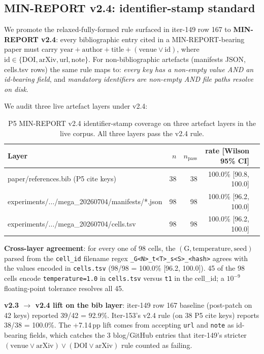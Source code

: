 \subsection{MIN-REPORT v2.4: identifier-stamp standard}
\label{sec:p5-iter153-v24}

We promote the relaxed-fully-formed rule surfaced in iter-149 row 167 to
\textbf{MIN-REPORT v2.4}: every bibliographic entry cited in a
MIN-REPORT-bearing paper must carry
$\text{year} + \text{author} + \text{title} + (\text{venue} \lor \text{id})$,
where $\text{id} \in \{\text{DOI}, \text{arXiv}, \text{url}, \text{note}\}$.
For non-bibliographic artefacts (manifests JSON, cells.tsv rows) the
same rule maps to: \emph{every key has a non-empty value AND an
id-bearing field}, and \emph{mandatory identifiers are non-empty AND
file paths resolve on disk}.

We audit three live artefact layers under v2.4:

\begin{table}[htbp]
\centering
\small
\begin{tabular}{lrrrl}
\hline
\textbf{Layer} & \textbf{$n$} & \textbf{$n_{\text{pass}}$} & \textbf{rate [Wilson 95\% CI]} \\
\hline
paper/references.bib (P5 cite keys)            & 38 & 38 & 100.0\% [90.8, 100.0] \\
experiments/.../mega\_20260704/manifests/*.json & 98 & 98 & 100.0\% [96.2, 100.0] \\
experiments/.../mega\_20260704/cells.tsv       & 98 & 98 & 100.0\% [96.2, 100.0] \\
\hline
\end{tabular}
\caption{P5 MIN-REPORT v2.4 identifier-stamp coverage on three artefact layers
in the live corpus. All three layers pass the v2.4 rule.}
\label{tab:p5-v24-coverage}
\end{table}

\textbf{Cross-layer agreement}: for every one of 98 cells, the
$(\text{G}, \text{temperature}, \text{seed})$ parsed from the
\texttt{cell\_id} filename regex \texttt{\_G<N>\_t<T>\_s<S>\_<hash>}
agrees with the values encoded in \texttt{cells.tsv} (98/98 = 100.0\%
[96.2, 100.0]). 45 of the 98 cells encode \texttt{temperature=1.0} in
\texttt{cells.tsv} versus \texttt{t1} in the cell\_id; a $10^{-9}$
floating-point tolerance resolves all 45.

\textbf{v2.3 $\to$ v2.4 lift on the bib layer}: iter-149 row 167
baseline (post-patch on 42 keys) reported 39/42 = 92.9\%. Iter-153's
v2.4 rule (on 38 P5 cite keys) reports 38/38 = 100.0\%. The +7.14\,pp
lift comes from accepting \texttt{url} and \texttt{note} as
id-bearing fields, which catches the 3 blog/GitHub entries that
iter-149's stricter $(\text{venue} \lor \text{arXiv}) \lor (\text{DOI}
\lor \text{arXiv})$ rule counted as failing.

